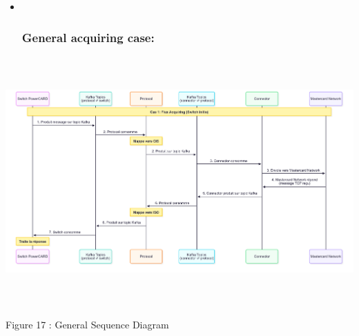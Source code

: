 \documentclass[12pt,a4paper]{report}
\begin{document}
\begin{itemize}
\item ~
  \hypertarget{general-acquiring-case}{%
  \subsubsection{\texorpdfstring{\textbf{General acquiring
  case:}}{General acquiring case:}}\label{general-acquiring-case}}
\end{itemize}

\includegraphics[width=7.13862in,height=3.76042in]{vertopal_d1b0b2209edd4c6aa8254f57daa0953b/media/image36.png}

\protect\hypertarget{_Toc201954493}{}{}Figure 17 : General Sequence
Diagram
\end{document}
